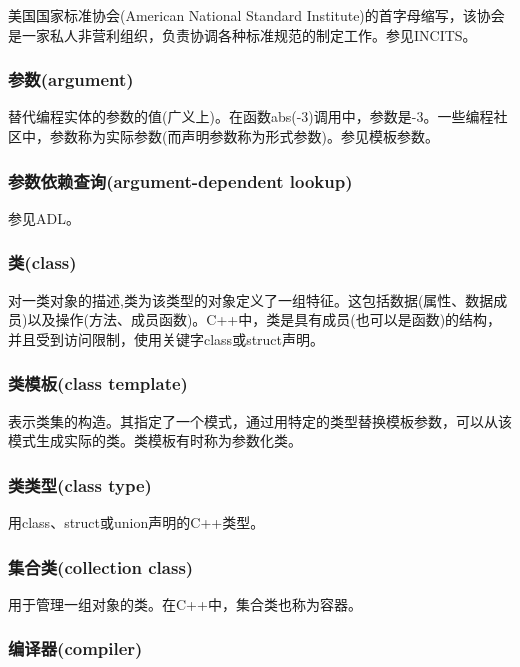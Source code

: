 美国国家标准协会(American National Standard Institute)的首字母缩写，该协会是一家私人非营利组织，负责协调各种标准规范的制定工作。参见INCITS。

\subsubsection{参数(argument)}

替代编程实体的参数的值(广义上)。在函数abs(-3)调用中，参数是-3。一些编程社区中，参数称为实际参数(而声明参数称为形式参数)。参见模板参数。

\subsubsection{参数依赖查询(argument-dependent lookup)}

参见ADL。

\subsubsection{类(class)}
 
对一类对象的描述,类为该类型的对象定义了一组特征。这包括数据(属性、数据成员)以及操作(方法、成员函数)。C++中，类是具有成员(也可以是函数)的结构，并且受到访问限制，使用关键字class或struct声明。

\subsubsection{类模板(class template)}

表示类集的构造。其指定了一个模式，通过用特定的类型替换模板参数，可以从该模式生成实际的类。类模板有时称为参数化类。

\subsubsection{类类型(class type)}

用class、struct或union声明的C++类型。

\subsubsection{集合类(collection class)}

用于管理一组对象的类。在C++中，集合类也称为容器。

\subsubsection{编译器(compiler)}

